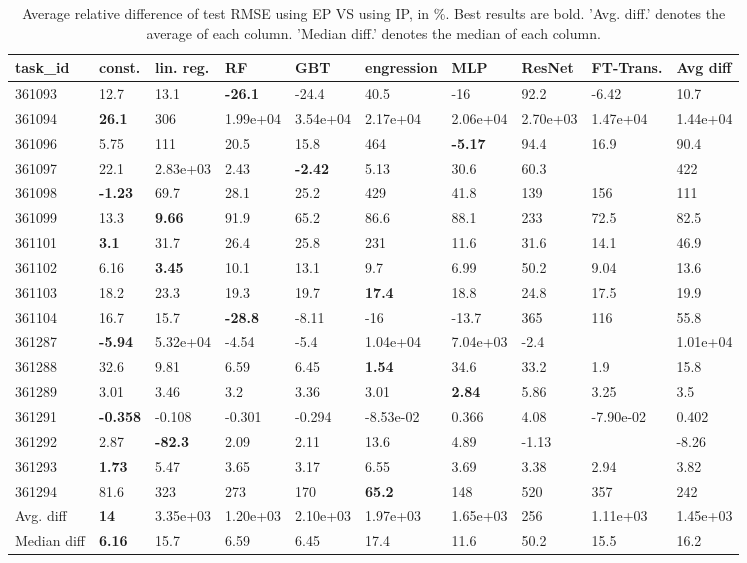 \begin{table}[ht!]
\centering
\begingroup\footnotesize
\begin{tabular}{llllllllll}
  \hline
\hline
task\_id & const. & lin. reg. & RF & GBT & engression & MLP & ResNet & FT-Trans. & Avg diff \\ 
  \hline
361093 & 12.7 & 13.1 & \textbf{-26.1} & -24.4 & 40.5 & -16 & 92.2 & -6.42 & 10.7 \\ 
  361094 & \textbf{26.1} & 306 &  1.99e+04 &  3.54e+04 &  2.17e+04 &  2.06e+04 &  2.70e+03 &  1.47e+04 &  1.44e+04 \\ 
  361096 & 5.75 & 111 & 20.5 & 15.8 & 464 & \textbf{-5.17} & 94.4 & 16.9 & 90.4 \\ 
  361097 & 22.1 &  2.83e+03 & 2.43 & \textbf{-2.42} & 5.13 & 30.6 & 60.3 &  & 422 \\ 
  361098 & \textbf{-1.23} & 69.7 & 28.1 & 25.2 & 429 & 41.8 & 139 & 156 & 111 \\ 
  361099 & 13.3 & \textbf{9.66} & 91.9 & 65.2 & 86.6 & 88.1 & 233 & 72.5 & 82.5 \\ 
  361101 & \textbf{3.1} & 31.7 & 26.4 & 25.8 & 231 & 11.6 & 31.6 & 14.1 & 46.9 \\ 
  361102 & 6.16 & \textbf{3.45} & 10.1 & 13.1 & 9.7 & 6.99 & 50.2 & 9.04 & 13.6 \\ 
  361103 & 18.2 & 23.3 & 19.3 & 19.7 & \textbf{17.4} & 18.8 & 24.8 & 17.5 & 19.9 \\ 
  361104 & 16.7 & 15.7 & \textbf{-28.8} & -8.11 & -16 & -13.7 & 365 & 116 & 55.8 \\ 
  361287 & \textbf{-5.94} &  5.32e+04 & -4.54 & -5.4 &  1.04e+04 &  7.04e+03 & -2.4 &  &  1.01e+04 \\ 
  361288 & 32.6 & 9.81 & 6.59 & 6.45 & \textbf{1.54} & 34.6 & 33.2 & 1.9 & 15.8 \\ 
  361289 & 3.01 & 3.46 & 3.2 & 3.36 & 3.01 & \textbf{2.84} & 5.86 & 3.25 & 3.5 \\ 
  361291 & \textbf{-0.358} & -0.108 & -0.301 & -0.294 & -8.53e-02 & 0.366 & 4.08 & -7.90e-02 & 0.402 \\ 
  361292 & 2.87 & \textbf{-82.3} & 2.09 & 2.11 & 13.6 & 4.89 & -1.13 &  & -8.26 \\ 
  361293 & \textbf{1.73} & 5.47 & 3.65 & 3.17 & 6.55 & 3.69 & 3.38 & 2.94 & 3.82 \\ 
  361294 & 81.6 & 323 & 273 & 170 & \textbf{65.2} & 148 & 520 & 357 & 242 \\ 
   \hline
Avg. diff & \textbf{14} &  3.35e+03 &  1.20e+03 &  2.10e+03 &  1.97e+03 &  1.65e+03 & 256 &  1.11e+03 &  1.45e+03 \\ 
  Median diff & \textbf{6.16} & 15.7 & 6.59 & 6.45 & 17.4 & 11.6 & 50.2 & 15.5 & 16.2 \\ 
   \hline
\hline
\end{tabular}
\endgroup
\caption{Average relative difference of test RMSE using EP VS using IP, in \%. 
                  Best results are bold. 
                  'Avg. diff.' denotes the average of each column.
                  'Median diff.' denotes the median of each column.} 
\label{TABLES/table_results_RMSE_clustering_num_and_cat_features_EP_VS_IP}
\end{table}
